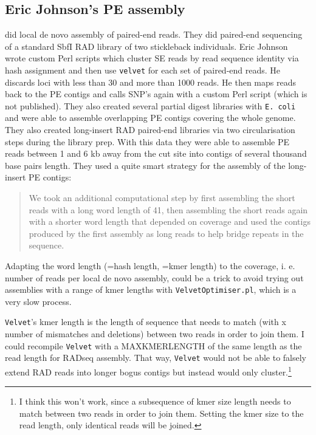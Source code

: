 \documentclass{article}\usepackage[]{graphicx}\usepackage[]{color}
\begin{document}
\subsection{Eric Johnson's PE assembly}
\label{Eric Johnson's PE assembly}
\citet{Etter2011} did local de novo assembly of paired-end reads. They did paired-end sequencing of a standard SbfI RAD library of two stickleback individuals. Eric Johnson wrote custom Perl scripts which cluster SE reads by read sequence identity via hash assignment and then use \texttt{velvet} for each set of paired-end reads. He discards loci with less than 30 and more than 1000 reads. He then maps reads back to the PE contigs and calls SNP's again with a custom Perl script  (which is not published). They also created several partial digest libraries with \texttt{E. coli} and were able to assemble overlapping PE contigs covering the whole genome. They also created long-insert RAD paired-end libraries via two circularisation steps during the library prep. With this data they were able to assemble PE reads between 1 and 6 kb away from the cut site into contigs of several thousand base pairs length. They used a quite smart strategy for the assembly of the long-insert PE contigs:
\begin{quote}
\textsf{We took an additional computational step by first assembling the short reads with a long word length of 41, then assembling the short reads again with a shorter word length that depended on coverage and used the contigs produced by the first assembly as long reads to help bridge repeats in the sequence.}
\end{quote}
Adapting the word length (=hash length, =kmer length) to the coverage, i. e. number of reads per local de novo assembly, could be a trick to avoid trying out assemblies with a range of kmer lengths with \texttt{VelvetOptimiser.pl}, which is a very slow process.

\texttt{Velvet}'s kmer length is the length of sequence that needs to match (with x number of mismatches and deletions) between two reads in order to join them. I could recompile \texttt{Velvet} with a MAXKMERLENGTH of the same length as the read length for RADseq assembly. That way, \texttt{Velvet} would not be able to falsely extend RAD reads into longer bogus contigs but instead would only cluster.\footnote{I think this won't work, since a subsequence of kmer size length needs to match between two reads in order to join them. Setting the kmer size to the read length, only identical reads will be joined.}
\vspace{10pt}
\end{document}
